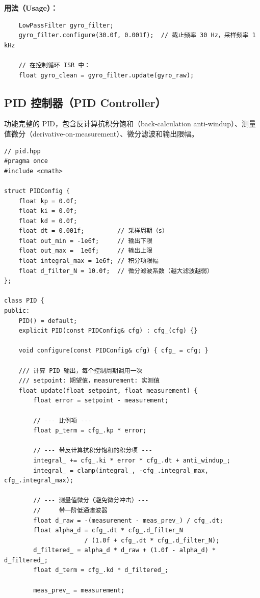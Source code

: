 \textbf{用法（Usage）：}
\begin{verbatim}
    LowPassFilter gyro_filter;
    gyro_filter.configure(30.0f, 0.001f);  // 截止频率 30 Hz，采样频率 1 kHz

    // 在控制循环 ISR 中：
    float gyro_clean = gyro_filter.update(gyro_raw);
\end{verbatim}

\subsection{PID 控制器（PID Controller）}

功能完整的 PID，包含反计算抗积分饱和（back-calculation anti-windup）、测量值微分（derivative-on-measurement）、微分滤波和输出限幅。

\begin{verbatim}
// pid.hpp
#pragma once
#include <cmath>

struct PIDConfig {
    float kp = 0.0f;
    float ki = 0.0f;
    float kd = 0.0f;
    float dt = 0.001f;         // 采样周期（s）
    float out_min = -1e6f;     // 输出下限
    float out_max =  1e6f;     // 输出上限
    float integral_max = 1e6f; // 积分项限幅
    float d_filter_N = 10.0f;  // 微分滤波系数（越大滤波越弱）
};

class PID {
public:
    PID() = default;
    explicit PID(const PIDConfig& cfg) : cfg_(cfg) {}

    void configure(const PIDConfig& cfg) { cfg_ = cfg; }

    /// 计算 PID 输出，每个控制周期调用一次
    /// setpoint: 期望值，measurement: 实测值
    float update(float setpoint, float measurement) {
        float error = setpoint - measurement;

        // --- 比例项 ---
        float p_term = cfg_.kp * error;

        // --- 带反计算抗积分饱和的积分项 ---
        integral_ += cfg_.ki * error * cfg_.dt + anti_windup_;
        integral_ = clamp(integral_, -cfg_.integral_max, cfg_.integral_max);

        // --- 测量值微分（避免微分冲击）---
        //     带一阶低通滤波器
        float d_raw = -(measurement - meas_prev_) / cfg_.dt;
        float alpha_d = cfg_.dt * cfg_.d_filter_N
                      / (1.0f + cfg_.dt * cfg_.d_filter_N);
        d_filtered_ = alpha_d * d_raw + (1.0f - alpha_d) * d_filtered_;
        float d_term = cfg_.kd * d_filtered_;

        meas_prev_ = measurement;


\end{verbatim}
